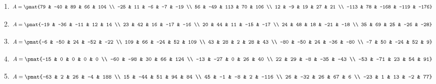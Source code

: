 \begin{enumerate}
\item

\begin{align*}
A = \pmat{79 & -40 & 89 & 66 & 104 \\ -25 & 11 & -6 & -7 & -19 \\ 56 & -49 & 113 & 70 & 106 \\ 12 & -9 & 19 & 27 & 21 \\ -113 & 78 & -168 & -119 & -176}
\end{align*}

\item

\begin{align*}
A = \pmat{-19 & -36 & -11 & 12 & 14 \\ 23 & 42 & 16 & -17 & -16 \\ 20 & 44 & 11 & -15 & -17 \\ 24 & 48 & 18 & -21 & -18 \\ 35 & 69 & 25 & -26 & -28}
\end{align*}

\item

\begin{align*}
A = \pmat{-6 & -50 & 24 & -52 & -22 \\ 109 & 66 & -24 & 52 & 109 \\ 43 & 28 & 2 & 28 & 43 \\ -80 & -50 & 24 & -36 & -80 \\ -7 & 50 & -24 & 52 & 9}
\end{align*}

\item

\begin{align*}
A = \pmat{-15 & 0 & 0 & 0 & 0 \\ -60 & -98 & 30 & 66 & 124 \\ -13 & -27 & 0 & 26 & 40 \\ 22 & 29 & -8 & -35 & -43 \\ -53 & -71 & 23 & 54 & 91}
\end{align*}

\item

\begin{align*}
A = \pmat{-63 & 2 & 26 & -4 & 188 \\ 15 & -44 & 51 & 94 & 84 \\ 45 & -1 & -8 & 2 & -116 \\ 26 & -32 & 26 & 67 & 6 \\ -23 & 1 & 13 & -2 & 77}
\end{align*}


\end{enumerate}
